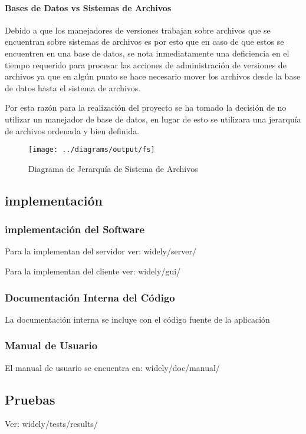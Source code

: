 \paragraph{Bases de Datos vs Sistemas de Archivos}

Debido a que los manejadores de versiones trabajan sobre archivos que se encuentran sobre sistemas de archivos es por esto que en caso de que estos se encuentren en una base de datos, se nota inmediatamente una deficiencia en el tiempo requerido para procesar las acciones de administración de versiones de archivos ya que en algún punto se hace necesario mover los archivos desde la base de datos hasta el sistema de archivos.

Por esta razón para la realización del proyecto se ha tomado la decisión de no utilizar un manejador de base de datos, en lugar de esto se utilizara una jerarquía de archivos ordenada y bien definida.


\begin{figure}
 \centering
 \texttt{[image: ../diagrams/output/fs]}
 \caption{Diagrama de Jerarquía de Sistema de Archivos}
 \label{diagrama:fs}
\end{figure}


\newpage

\subsection{implementación}


\subsubsection{implementación del Software}

Para la implementan del servidor ver: widely/server/

Para la implementan del cliente ver: widely/gui/


\subsubsection{Documentación Interna del Código}

La documentación interna se incluye con el código fuente de la aplicación


\subsubsection{Manual de Usuario}

El manual de usuario se encuentra en: widely/doc/manual/


\subsection{Pruebas}

Ver: widely/tests/results/